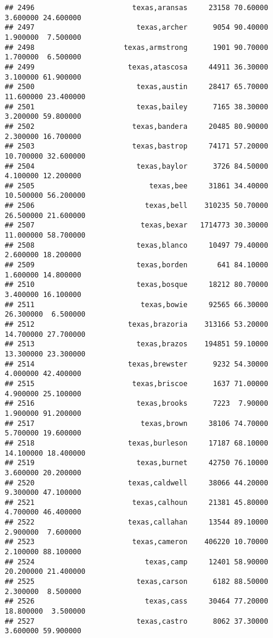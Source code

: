 \documentclass[
]{article}
\begin{document}
\begin{verbatim}
## 2496                       texas,aransas     23158 70.60000  3.600000 24.600000
## 2497                        texas,archer      9054 90.40000  1.900000  7.500000
## 2498                     texas,armstrong      1901 90.70000  1.700000  6.500000
## 2499                      texas,atascosa     44911 36.30000  3.100000 61.900000
## 2500                        texas,austin     28417 65.70000 11.600000 23.400000
## 2501                        texas,bailey      7165 38.30000  3.200000 59.800000
## 2502                       texas,bandera     20485 80.90000  2.300000 16.700000
## 2503                       texas,bastrop     74171 57.20000 10.700000 32.600000
## 2504                        texas,baylor      3726 84.50000  4.100000 12.200000
## 2505                           texas,bee     31861 34.40000 10.500000 56.200000
## 2506                          texas,bell    310235 50.70000 26.500000 21.600000
## 2507                         texas,bexar   1714773 30.30000 11.000000 58.700000
## 2508                        texas,blanco     10497 79.40000  2.600000 18.200000
## 2509                        texas,borden       641 84.10000  1.600000 14.800000
## 2510                        texas,bosque     18212 80.70000  3.400000 16.100000
## 2511                         texas,bowie     92565 66.30000 26.300000  6.500000
## 2512                      texas,brazoria    313166 53.20000 14.700000 27.700000
## 2513                        texas,brazos    194851 59.10000 13.300000 23.300000
## 2514                      texas,brewster      9232 54.30000  4.000000 42.400000
## 2515                       texas,briscoe      1637 71.00000  4.900000 25.100000
## 2516                        texas,brooks      7223  7.90000  1.900000 91.200000
## 2517                         texas,brown     38106 74.70000  5.700000 19.600000
## 2518                      texas,burleson     17187 68.10000 14.100000 18.400000
## 2519                        texas,burnet     42750 76.10000  3.600000 20.200000
## 2520                      texas,caldwell     38066 44.20000  9.300000 47.100000
## 2521                       texas,calhoun     21381 45.80000  4.700000 46.400000
## 2522                      texas,callahan     13544 89.10000  2.900000  7.600000
## 2523                       texas,cameron    406220 10.70000  2.100000 88.100000
## 2524                          texas,camp     12401 58.90000 20.200000 21.400000
## 2525                        texas,carson      6182 88.50000  2.300000  8.500000
## 2526                          texas,cass     30464 77.20000 18.800000  3.500000
## 2527                        texas,castro      8062 37.30000  3.600000 59.900000

\end{verbatim}
\end{document}
